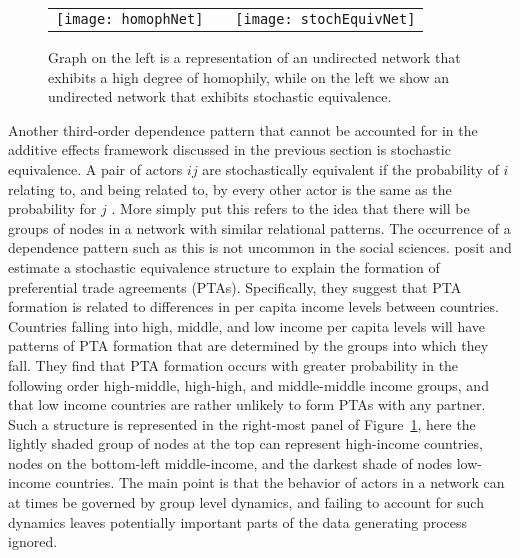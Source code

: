 
\begin{figure}[ht]
	\centering
	\begin{tabular}{lcr}
	\texttt{[image: homophNet]} & \hspace{2cm} &
	\texttt{[image: stochEquivNet]}	
	\end{tabular}
	\caption{Graph on the left is a representation of an undirected network that exhibits a high degree of homophily, while on the left we show an undirected network that exhibits stochastic equivalence. }
	\label{fig:homphStochEquivNet}
\end{figure}

Another third-order dependence pattern that cannot be accounted for in the additive effects framework discussed in the previous section is stochastic equivalence. A pair of actors $ij$ are stochastically equivalent if the probability of $i$ relating to, and being related to, by every other actor is the same as the probability for $j$ \citep{anderson:etal:1992}. More simply put this refers to the idea that there will be groups of nodes in a network with similar relational patterns. The occurrence of a dependence pattern such as this is not uncommon in the social sciences. \citet{manger:etal:2012} posit and estimate a stochastic equivalence structure to explain the formation of preferential trade agreements (PTAs). Specifically, they suggest that PTA formation is related to differences in per capita income levels between countries. Countries falling into high, middle, and low income per capita levels will have patterns of PTA formation that are determined by the groups into which they fall. They find that PTA formation occurs with greater probability in the following order high-middle, high-high, and middle-middle income groups, and that low income countries are rather unlikely to form PTAs with any partner. Such a structure is represented in the right-most panel of Figure~\ref{fig:homphStochEquivNet}, here the lightly shaded group of nodes at the top can represent high-income countries, nodes on the bottom-left middle-income, and the darkest shade of nodes low-income countries. The main point is that the behavior of actors in a network can at times be governed by group level dynamics, and failing to account for such dynamics leaves potentially important parts of the data generating process ignored. 

